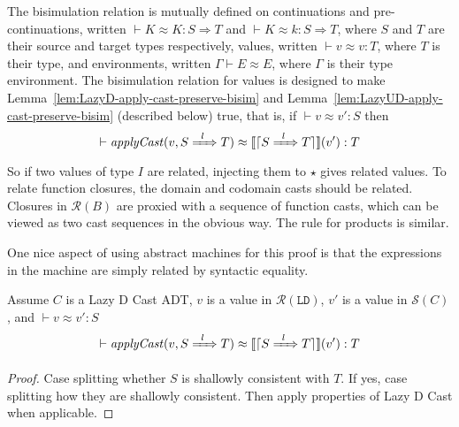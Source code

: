 \documentclass[runningheads]{llncs}
\newcommand{\RMachine}[1]{\ensuremath{\mathcal{R}(#1)}}
\newcommand{\LDMachine}{\RMachine{\BLD}}
\newcommand{\SMachine}[1]{\ensuremath{\mathcal{S}(#1)}}
\newcommand{\Tdyn}[0]{\ensuremath{\star}}
\newcommand{\ccast}[3]{#1 \xRightarrow[]{\enskip #2 \enskip} #3}
\newcommand{\BLD}[0]{\ensuremath{\mathtt{LD}}}
\newcommand{\denote}[1]{\ensuremath{\llbracket #1 \rrbracket}}
\newcommand{\applyCast}[2]{\ensuremath{\mathit{applyCast}(#1,#2)}}
\newcommand{\translate}[1]{\ensuremath{\lceil#1\rceil}}
\newcommand{\valuetyping}[2]{\ensuremath{\vdash #1 : #2}}
\newcommand{\casttyping}[3]{\ensuremath{\vdash #1 : #2 \Longrightarrow #3}}
\newcommand{\bisimE}[3]{\ensuremath{#1 \vdash #2 \approx #3}}
\newcommand{\bisimv}[3]{\valuetyping{#1 \approx #2}{#3}}
\newcommand{\bisimr}[3]{\valuetyping{#1 \approx #2}{#3}}
\newcommand{\bisimK}[4]{\casttyping{#1 \approx #2}{#3}{#4}}
\begin{document}
The bisimulation relation is mutually defined on continuations and pre-continuations,
written 
$\bisimK{K}{K}{S}{T}$ and $\bisimK{K}{k}{S}{T}$, where $S$ and $T$ are their 
source and target types respectively, values, written $\bisimv{v}{v}{T}$, 
where $T$ is their type, and environments, written $\bisimE{\Gamma}{E}{E}$, 
where $\Gamma$ is their type environment. The bisimulation relation for values 
is designed to make Lemma~\ref{lem:LazyD-apply-cast-preserve-bisim} and 
Lemma~\ref{lem:LazyUD-apply-cast-preserve-bisim} (described below) true, that 
is, if $\bisimv{v}{v'}{S}$
then
\[
\bisimr{
	\applyCast{v}{\ccast{S}{l}{T}}
}{
	\denote{\translate{\ccast{S}{l}{T}}}(v')
}{T}
\]
So if two values of type $I$ are related, injecting them to $\Tdyn$
gives related values.
%
To relate function closures, the domain and codomain casts should be related. 
Closures in \RMachine{B} are proxied with a sequence of function casts, which 
can be viewed as two cast sequences in the obvious way.
%
The rule for products is similar.

One nice aspect of using abstract machines for this proof is that
the expressions in the machine are simply related by syntactic equality.

\begin{lemma}
	\label{lem:LazyD-apply-cast-preserve-bisim}
	Assume $C$ is a Lazy D Cast ADT,
	$v$ is a value in \LDMachine,
	$v'$ is a value in \SMachine{C},
	and $\bisimv{v}{v'}{S}$
	\[
	\bisimr{
		\applyCast{v}{\ccast{S}{l}{T}}
	}{
		\denote{\translate{\ccast{S}{l}{T}}}(v')
	}{T}
	\]
\end{lemma}
\begin{proof}
	Case splitting whether $S$ is shallowly consistent with $T$.
	If yes, case splitting how they are shallowly consistent.
	Then apply properties of Lazy D Cast when applicable.
\end{proof}
\end{document}
